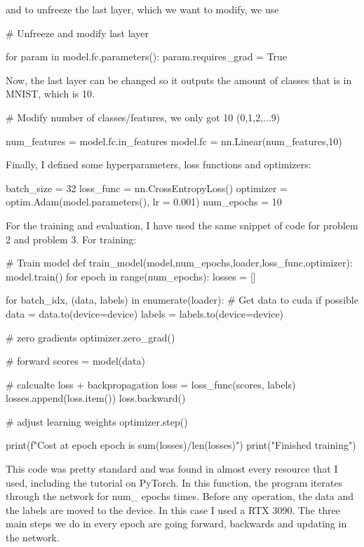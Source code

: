\documentclass{article}
\numberwithin{equation}{section}
\numberwithin{equation}{section}
\begin{document}
and to unfreeze the last layer, which we want to modify, we use 


\begin{python}
# Unfreeze and modify last layer

for param in model.fc.parameters():
    param.requires_grad = True
    
\end{python}


Now, the last layer can be changed so it outputs the amount of classes that is in MNIST, which is 10.

\begin{python}
# Modify number of classes/features, we only got 10 (0,1,2,...9)

num_features = model.fc.in_features
model.fc = nn.Linear(num_features,10)
    
\end{python}

Finally, I defined some hyperparameters, loss functions and optimizers:

\begin{python}
batch_size = 32
loss_func = nn.CrossEntropyLoss()   
optimizer = optim.Adam(model.parameters(), lr = 0.001)   
num_epochs = 10

\end{python}



For the training and evaluation, I have used the same snippet of code for problem 2 and problem 3. For training:

\begin{python}
# Train model
def train_model(model,num_epochs,loader,loss_func,optimizer):
    model.train()
    for epoch in range(num_epochs):
        losses = []

        for batch_idx, (data, labels) in enumerate(loader):
            # Get data to cuda if possible
            data = data.to(device=device)
            labels = labels.to(device=device)
            
            # zero gradients
            optimizer.zero_grad()

            # forward
            scores = model(data)
            
            # calcualte loss + backpropagation
            loss = loss_func(scores, labels)
            losses.append(loss.item())
            loss.backward()
            
            # adjust learning weights
            optimizer.step()

        print(f"Cost at epoch {epoch} is {sum(losses)/len(losses)}")
    print("Finished training")

\end{python}
This code was pretty standard and was found in almost every resource that I used, including the tutorial on PyTorch. In this function, the program iterates through the network for num\_ epochs times. Before any operation, the data and the labels are moved to the device. In this case I used a RTX 3090. The three main steps we do in every epoch are going forward, backwards and updating in the network.
\end{document}
